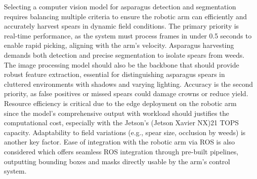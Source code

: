 Selecting a computer vision model for asparagus detection and segmentation requires balancing multiple criteria to ensure the robotic arm can efficiently and accurately harvest spears in dynamic field conditions. The primary priority is real-time performance, as the system must process frames in under 0.5 seconds to enable rapid picking, aligning with the arm’s velocity. Asparagus harvesting demands both detection and precise segmentation to isolate spears from weeds. The image processing model should also be the backbone that should provide robust feature extraction, essential for distinguishing asparagus spears in cluttered environments with shadows and varying lighting. Accuracy is the second priority, as false positives or missed spears could damage crowns or reduce yield. Resource efficiency is critical due to the edge deployment on the robotic arm since the model's comprehensive output with workload should justifies the computational cost, especially with the Jetson’s (Jetson Xavier NX)21 TOPS capacity. Adaptability to field variations (e.g., spear size, occlusion by weeds) is another key factor. Ease of integration with the robotic arm via ROS is also considered which offers seamless ROS integration through pre-built pipelines, outputting bounding boxes and masks directly usable by the arm’s control system. 


